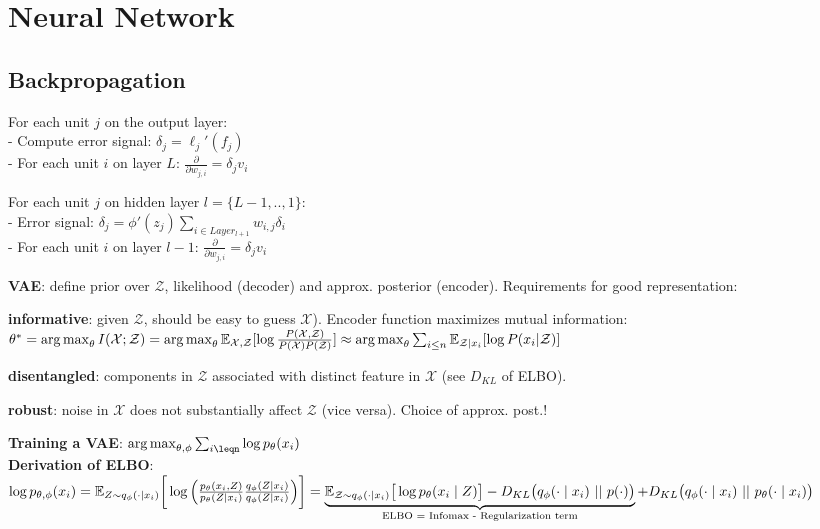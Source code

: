 \section{Neural Network}
\subsection*{Backpropagation}
For each unit $j$ on the output layer:\\
- Compute error signal: $\delta_j = \ell_j'(f_j)$\\
- For each unit $i$ on layer $L$: $\frac{\partial}{\partial w_{j,i}} = \delta_j v_i$

For each unit $j$ on hidden layer $l=\{L-1,..,1\}$:\\
- Error signal: $\delta_j = \phi'(z_j) \sum_{i\in Layer_{l+1}} w_{i,j}\delta_i$\\
- For each unit $i$ on layer $l-1$: $\frac{\partial}{\partial w_{j,i}} = \delta_j v_i$

\textbf{VAE}: define prior over $\mathcal{Z}$, likelihood (decoder) and approx. posterior (encoder). Requirements for good representation:\\
\begin{inparaitem}[\textbullet]
    \item \textbf{informative}: given $\mathcal{Z}$, should be easy to guess $\mathcal{X}$). Encoder function maximizes mutual information: $\theta^* = \operatorname*{arg\,max}_\theta I(\mathcal{X};\mathcal{Z})=\operatorname*{arg\,max}_\theta \mathbb E_{\mathcal{X},\mathcal{Z}}[\log\frac{P(\mathcal{X,\mathcal{Z}})}{P(\mathcal{X})P(\mathcal{Z})}]\\
    \approx \operatorname*{arg\,max}_\theta \sum_{i\leq n} \mathbb E_{\mathcal{Z}|x_i}[\log P(x_i|\mathcal{Z})]$\\
    \item \textbf{disentangled}: components in $\mathcal{Z}$ associated with distinct feature in $\mathcal{X}$ (see $D_{KL}$ of ELBO). \\
    \item \textbf{robust}: noise in $\mathcal{X}$ does not substantially affect $\mathcal{Z}$ (vice versa). Choice of approx. post.!\\
\end{inparaitem}

\textbf{Training a VAE}: $\argmax_{\theta,\phi}\sum_{i\leqn}\log p_{\theta}(x_i)$\\
\textbf{Derivation of ELBO}:
$
    \log p_{\theta, \phi}(x_i)
    = \mathbb E_{Z \sim q_{\phi}(\cdot \mid x_i)}
    \bigg[ \log \Big(
    \frac{p_\theta(x_i, Z)}{p_\theta (Z \mid x_i)}
    \frac{q_\phi(Z \mid x_i)}{q_\phi(Z \mid x_i)}
    \Big) \bigg]
    =
    \underbrace{\mathbb E_{\mathcal{Z} \sim q_{\phi}(\cdot \mid x_i) } \big[
        \log p_{\theta}(x_i \mid Z)
    \big]
    - D_{KL} \big(
        q_\phi(\cdot \mid x_i)\ ||\ p(\cdot)
    \big)}_\text{ELBO = Infomax - Regularization term}
    + D_{KL} \big(
        q_\phi(\cdot \mid x_i)\ ||\ p_\theta(\cdot \mid x_i)
    \big)
$


